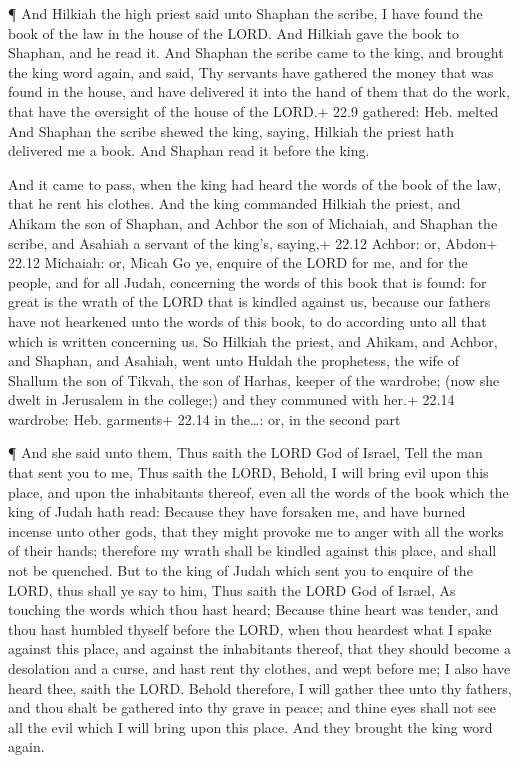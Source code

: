  ¶ And Hilkiah the high priest said unto Shaphan the scribe,
I have found the book of the law in the house of the LORD. And Hilkiah
gave the book to Shaphan, and he read it.  And Shaphan the
scribe came to the king, and brought the king word again, and said, Thy
servants have gathered the money that was found in the house, and have
delivered it into the hand of them that do the work, that have the
oversight of the house of the LORD.+ 22.9 gathered: Heb. melted
 And Shaphan the scribe shewed the king, saying, Hilkiah
the priest hath delivered me a book. And Shaphan read it before the
king.

 And it came to pass, when the king had heard the words of
the book of the law, that he rent his clothes.  And the
king commanded Hilkiah the priest, and Ahikam the son of Shaphan, and
Achbor the son of Michaiah, and Shaphan the scribe, and Asahiah a
servant of the king's, saying,+ 22.12 Achbor: or, Abdon+ 22.12 Michaiah:
or, Micah  Go ye, enquire of the LORD for me, and for the
people, and for all Judah, concerning the words of this book that is
found: for great is the wrath of the LORD that is kindled against us,
because our fathers have not hearkened unto the words of this book, to
do according unto all that which is written concerning us. 
So Hilkiah the priest, and Ahikam, and Achbor, and Shaphan, and Asahiah,
went unto Huldah the prophetess, the wife of Shallum the son of Tikvah,
the son of Harhas, keeper of the wardrobe; (now she dwelt in Jerusalem
in the college;) and they communed with her.+ 22.14 wardrobe: Heb.
garments+ 22.14 in the\ldots: or, in the second part

 ¶ And she said unto them, Thus saith the LORD God of
Israel, Tell the man that sent you to me,  Thus saith the
LORD, Behold, I will bring evil upon this place, and upon the
inhabitants thereof, even all the words of the book which the king of
Judah hath read:  Because they have forsaken me, and have
burned incense unto other gods, that they might provoke me to anger with
all the works of their hands; therefore my wrath shall be kindled
against this place, and shall not be quenched.  But to the
king of Judah which sent you to enquire of the LORD, thus shall ye say
to him, Thus saith the LORD God of Israel, As touching the words which
thou hast heard;  Because thine heart was tender, and thou
hast humbled thyself before the LORD, when thou heardest what I spake
against this place, and against the inhabitants thereof, that they
should become a desolation and a curse, and hast rent thy clothes, and
wept before me; I also have heard thee, saith the LORD. 
Behold therefore, I will gather thee unto thy fathers, and thou shalt be
gathered into thy grave in peace; and thine eyes shall not see all the
evil which I will bring upon this place. And they brought the king word
again.


